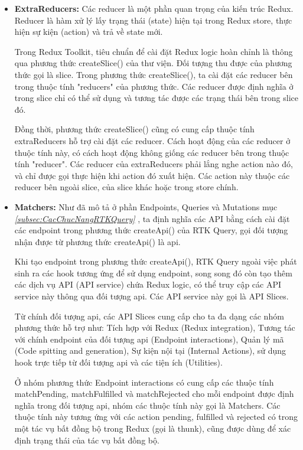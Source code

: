 \begin{itemize}
      \item \textbf{ExtraReducers:} Các reducer là một phần quan trọng của kiến trúc Redux.
      Reducer là hàm xử lý lấy trạng thái (state) hiện tại trong Redux store, thực hiện sự kiện (action) và trả về state mới.
      
      Trong Redux Toolkit, tiêu chuẩn để cài đặt Redux logic hoàn chỉnh là thông qua phương thức createSlice() của thư viện.
      Đối tượng thu được của phương thức gọi là slice.
      Trong phương thức createSlice(), ta cài đặt các reducer bên trong thuộc tính "reducers" của phương thức.
      Các reducer được định nghĩa ở trong slice chỉ có thể sử dụng và tương tác được các trạng thái bên trong slice đó.
      
      Đồng thời, phương thức createSlice() cũng có cung cấp thuộc tính extraReducers hỗ trợ cài đặt các reducer.
      Cách hoạt động của các reducer ở thuộc tính này, có cách hoạt động không giống các reducer bên trong thuộc tính "reducer".
      Các reducer của extraReducers phải lắng nghe action nào đó, và chỉ được gọi thực hiện khi action đó xuất hiện.
      Các action này thuộc các reducer bên ngoài slice, của slice khác hoặc trong store chính.
      
      \item \textbf{Matchers:} Như đã mô tả ở phần Endpoints, Queries và Mutations mục \textit{\ref{subsec:CacChucNangRTKQuery} }, ta định nghĩa các API bằng cách cài đặt các endpoint trong phương thức createApi() của RTK Query, gọi đối tượng nhận được từ phương thức createApi() là api.
      
      Khi tạo endpoint trong phương thức createApi(), RTK Query ngoài việc phát sinh ra các hook tương ứng để sử dụng endpoint, 
      song song đó còn tạo thêm các dịch vụ API (API service) chứa Redux logic, có thể truy cập các API service này thông qua đối tượng api.
      Các API service này gọi là API Slices.
      
      Từ chính đối tượng api, các API Slices cung cấp cho ta đa dạng các nhóm phương thức hỗ trợ như: Tích hợp với Redux (Redux integration), Tương tác với chính endpoint của đối tượng api (Endpoint interactions), Quản lý mã (Code spitting and generation), Sự kiện nội tại (Internal Actions), sử dụng hook trực tiếp từ đối tượng api và các tiện ích (Utilities).
      
      Ở nhóm phương thức Endpoint interactions có cung cấp các thuộc tính matchPending, matchFulfilled và matchRejected cho mỗi endpoint được định nghĩa trong đối tượng api, nhóm các thuộc tính này gọi là Matchers.
      Các thuộc tính này tương ứng với các action pending, fulfilled và rejected có trong một tác vụ bất đồng bộ trong Redux (gọi là thunk), cũng được dùng để xác định trạng thái của tác vụ bất đồng bộ.
\end{itemize}

